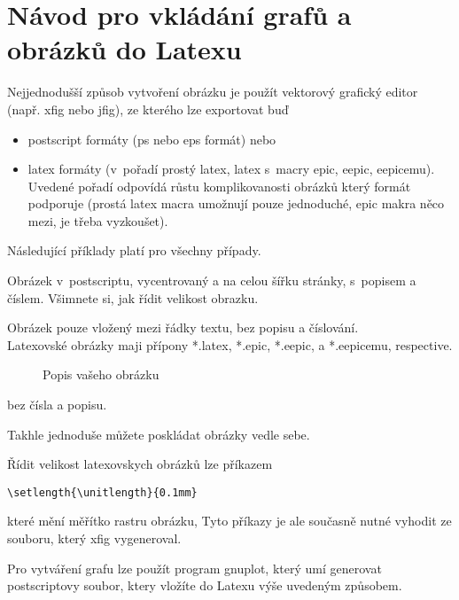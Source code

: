 \documentclass[12pt]{article}
\begin{document}
\appendix

\section{Návod pro vkládání grafů a obrázků do Latexu}

Nejjednodušší způsob vytvoření obrázku je použít vektorový grafický
editor (např. xfig nebo jfig), ze kterého lze exportovat buď
\begin{itemize}
\item postscript formáty (ps nebo eps formát) nebo
\item latex formáty (v~pořadí prostý latex, latex s~macry epic, eepic, eepicemu). Uvedené pořadí odpovídá růstu
komplikovanosti obrázků který formát podporuje (prostá latex macra
umožnují pouze jednoduché, epic makra něco mezi, je třeba
vyzkoušet).

\end{itemize}
Následující příklady platí pro všechny případy.

Obrázek v~postscriptu, vycentrovaný a na celou šířku stránky,
s~popisem a číslem. Všimnete si, jak řídit velikost obrazku.

Obrázek pouze vložený mezi řádky textu, bez popisu a číslování.\\

Latexovské obrázky maji přípony *.latex, *.epic, *.eepic, a
*.eepicemu, respective.
\begin{figure}[ht]
\begin{center}
\end{center}
\caption{Popis vašeho obrázku} \label{l1}
\end{figure}

bez čísla a popisu.

Takhle jednoduše můžete poskládat obrázky vedle sebe.

Řídit velikost latexovskych obrázků lze příkazem
\begin{verbatim}
\setlength{\unitlength}{0.1mm}
\end{verbatim}
které mění měřítko rastru obrázku, Tyto příkazy je ale současně
nutné vyhodit ze souboru, který xfig vygeneroval.

Pro vytváření grafu lze použít program gnuplot, který umí generovat
postscriptovy soubor, ktery vložíte do Latexu výše uvedeným
způsobem.
\end{document}
